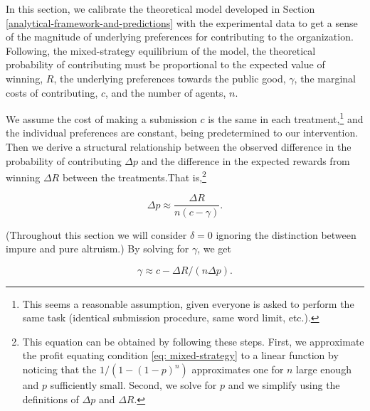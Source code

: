 \documentclass[12pt, titlepage]{article}
\begin{document}
In this section, we calibrate the theoretical model developed in Section
\ref{analytical-framework-and-predictions} with the experimental data to
get a sense of the magnitude of underlying preferences for contributing
to the organization. Following, the mixed-strategy equilibrium of the
model, the theoretical probability of contributing must be proportional
to the expected value of winning, \(R\), the underlying preferences
towards the public good, \(\gamma\), the marginal costs of contributing,
\(c\), and the number of agents, \(n\).

We assume the cost of making a submission \(c\) is the same in each
treatment,\footnote{This seems a reasonable assumption, given everyone
  is asked to perform the same task (identical submission procedure,
  same word limit, etc.).} and the individual preferences are constant,
being predetermined to our intervention. Then we derive a structural
relationship between the observed difference in the probability of
contributing \(\Delta p\) and the difference in the expected rewards
from winning \(\Delta R\) between the treatments.That is,\footnote{This
  equation can be obtained by following these steps. First, we
  approximate the profit equating condition \eqref{eq: mixed-strategy}
  to a linear function by noticing that the \(1/(1-(1-p)^n)\)
  approximates one for \(n\) large enough and \(p\) sufficiently small.
  Second, we solve for \(p\) and we simplify using the definitions of
  \(\Delta p\) and \(\Delta R\).}

\begin{equation}
  \Delta p \approx\frac{\Delta R}{n (c - \gamma)}.
\end{equation}

(Throughout this section we will consider \(\delta=0\) ignoring the
distinction between impure and pure altruism.) By solving for
\(\gamma\), we get

\begin{equation}
  \label{eq: gamma}
  \gamma   \approx  c -  \Delta R / (n\Delta p). 
\end{equation}
\end{document}
